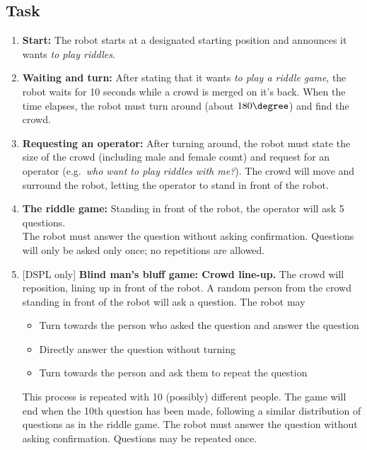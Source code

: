\subsection{Task}
\begin{enumerate}
    \item \textbf{Start:} The robot starts at a designated starting position and announces it wants \textit{to play riddles}.

    \item \textbf{Waiting and turn:} After stating that it wants \textit{to play a riddle game}, the robot waits for 10 seconds while a crowd is merged on it's back. When the time elapses, the robot must turn around (about $180\degree$) and find the crowd.

    \item \textbf{Requesting an operator:} After turning around, the robot must state the size of the crowd (including male and female count\footnotemark) and request for an operator (e.g.~\textit{who want to play riddles with me?}). The crowd will move and surround the robot, letting the operator to stand in front of the robot.

    \item \textbf{The riddle game:} Standing in front of the robot, the operator will ask 5 questions.\\
    The robot must answer the question without asking confirmation. Questions will only be asked only once; no repetitions are allowed.

    \setcounter{enumTempSPR}{\theenumi}
    \item {[DSPL only]} \textbf{Blind man's bluff game: Crowd line-up.} The crowd will reposition, lining up in front of the robot. A random person from the crowd standing in front of the robot will ask a question. The robot may
    \begin{itemize}
        \item Turn towards the person who asked the question and answer the question
        \item Directly answer the question without turning
        \item Turn towards the person and ask them to repeat the question
    \end{itemize}
    This process is repeated with 10 (possibly) different people.
    The game will end when the 10th question has been made, following a similar distribution of questions as in the riddle game. The robot must answer the question without asking confirmation. Questions may be repeated once.


\end{enumerate}
